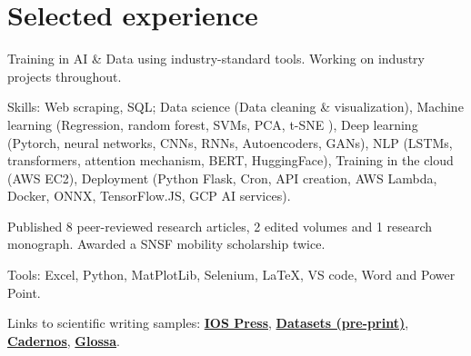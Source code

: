 \documentclass[]{plushcv}
\begin{document}
\begin{minipage}[t]{0.70\textwidth} 



\section{Selected experience}

Training in AI \& Data using industry-standard tools. Working on industry projects throughout.
\sectionsep
\sectionsep
\begin{tightemize}
\item Skills: Web scraping, SQL; Data science (Data cleaning \& visualization), Machine learning (Regression, random forest, SVMs, PCA, t-SNE ), Deep learning (Pytorch, neural networks, CNNs, RNNs, Autoencoders, GANs), NLP (LSTMs, transformers, attention mechanism, BERT, HuggingFace), Training in the cloud (AWS EC2), Deployment (Python Flask, Cron, API creation, AWS Lambda, Docker, ONNX, TensorFlow.JS, GCP AI services).
\end{tightemize}
\sectionsep

Published 8 peer-reviewed research articles, 2 edited volumes and 1 research monograph. Awarded a SNSF mobility scholarship twice.
\sectionsep
\begin{tightemize}
\item Tools: Excel, Python, MatPlotLib, Selenium, LaTeX, VS code, Word and Power Point.
\item Links to scientific writing samples: \href{https://ebooks.iospress.nl/doi/10.3233/SHTI220702}{\textbf{IOS Press}}, \href{https://github.com/CaterinaBi/health-communication-paper2/blob/main/paper2023/first-submission/BonanSamo2023.pdf}{\textbf{Datasets (pre-print)}}, \href{https://periodicos.unb.br/index.php/cs/article/view/40559/33149}{\textbf{Cadernos}}, \href{https://doi.org/10.16995/glossa.5714}{\textbf{Glossa}}.
\end{tightemize}
\sectionsep


\end{minipage}
\end{document}
